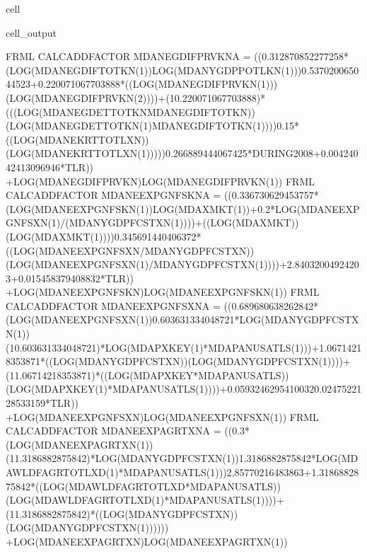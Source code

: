 \documentclass[letterpaper,10pt,english]{jupyterBook}
\begin{document}
\begin{sphinxuseclass}{cell}
\begin{sphinxVerbatimOutput}
\begin{sphinxuseclass}{cell_output}
\begin{sphinxVerbatim}[commandchars=\\\{\}]
FRML \PYGZlt{}CALC\PYGZus{}ADD\PYGZus{}FACTOR\PYGZgt{} MDANEGDIFPRVKN\PYGZus{}A = \PYGZhy{} ((\PYGZhy{}0.312870852277258*(LOG(MDANEGDIFTOTKN(\PYGZhy{}1))\PYGZhy{}LOG(MDANYGDPPOTLKN(\PYGZhy{}1)))\PYGZhy{}0.537020065044523+0.220071067703888*((LOG(MDANEGDIFPRVKN(\PYGZhy{}1)))\PYGZhy{}(LOG(MDANEGDIFPRVKN(\PYGZhy{}2))))+(1\PYGZhy{}0.220071067703888)*(((LOG(MDANEGDETTOTKN\PYGZhy{}MDANEGDIFTOTKN))\PYGZhy{}(LOG(MDANEGDETTOTKN(\PYGZhy{}1)\PYGZhy{}MDANEGDIFTOTKN(\PYGZhy{}1))))\PYGZhy{}0.15*((LOG(MDANEKRTTOTLXN))\PYGZhy{}(LOG(MDANEKRTTOTLXN(\PYGZhy{}1)))))\PYGZhy{}0.266889444067425*DURING\PYGZus{}2008+0.00424042413096946*T\PYGZus{}LR)) +LOG(MDANEGDIFPRVKN)\PYGZhy{}LOG(MDANEGDIFPRVKN(\PYGZhy{}1))\PYGZdl{}
FRML \PYGZlt{}CALC\PYGZus{}ADD\PYGZus{}FACTOR\PYGZgt{} MDANEEXPGNFSKN\PYGZus{}A = \PYGZhy{} ((\PYGZhy{}0.336730629453757*(LOG(MDANEEXPGNFSKN(\PYGZhy{}1))\PYGZhy{}LOG(MDAXMKT(\PYGZhy{}1))+0.2*LOG(MDANEEXPGNFSXN(\PYGZhy{}1)/(MDANYGDPFCSTXN(\PYGZhy{}1))))+((LOG(MDAXMKT))\PYGZhy{}(LOG(MDAXMKT(\PYGZhy{}1))))\PYGZhy{}0.345691440406372*((LOG(MDANEEXPGNFSXN/MDANYGDPFCSTXN))\PYGZhy{}(LOG(MDANEEXPGNFSXN(\PYGZhy{}1)/MDANYGDPFCSTXN(\PYGZhy{}1))))+2.84032004924203+0.015458379408832*T\PYGZus{}LR)) +LOG(MDANEEXPGNFSKN)\PYGZhy{}LOG(MDANEEXPGNFSKN(\PYGZhy{}1))\PYGZdl{}
FRML \PYGZlt{}CALC\PYGZus{}ADD\PYGZus{}FACTOR\PYGZgt{} MDANEEXPGNFSXN\PYGZus{}A = \PYGZhy{} ((\PYGZhy{}0.689680638262842*(LOG(MDANEEXPGNFSXN(\PYGZhy{}1))\PYGZhy{}0.603631334048721*LOG(MDANYGDPFCSTXN(\PYGZhy{}1))\PYGZhy{}(1\PYGZhy{}0.603631334048721)*LOG(MDAPXKEY(\PYGZhy{}1)*MDAPANUSATLS(\PYGZhy{}1)))+1.06714218353871*((LOG(MDANYGDPFCSTXN))\PYGZhy{}(LOG(MDANYGDPFCSTXN(\PYGZhy{}1))))+(1\PYGZhy{}1.06714218353871)*((LOG(MDAPXKEY*MDAPANUSATLS))\PYGZhy{}(LOG(MDAPXKEY(\PYGZhy{}1)*MDAPANUSATLS(\PYGZhy{}1))))+0.0593246295410032\PYGZhy{}0.0247522128533159*T\PYGZus{}LR)) +LOG(MDANEEXPGNFSXN)\PYGZhy{}LOG(MDANEEXPGNFSXN(\PYGZhy{}1))\PYGZdl{}
FRML \PYGZlt{}CALC\PYGZus{}ADD\PYGZus{}FACTOR\PYGZgt{} MDANEEXPAGRTXN\PYGZus{}A = \PYGZhy{} ((\PYGZhy{}0.3*(LOG(MDANEEXPAGRTXN(\PYGZhy{}1))\PYGZhy{}(1\PYGZhy{}1.3186882875842)*LOG(MDANYGDPFCSTXN(\PYGZhy{}1))\PYGZhy{}1.3186882875842*LOG(MDAWLDFAGRTOTLXD(\PYGZhy{}1)*MDAPANUSATLS(\PYGZhy{}1)))\PYGZhy{}2.85770216483863+1.3186882875842*((LOG(MDAWLDFAGRTOTLXD*MDAPANUSATLS))\PYGZhy{}(LOG(MDAWLDFAGRTOTLXD(\PYGZhy{}1)*MDAPANUSATLS(\PYGZhy{}1))))+(1\PYGZhy{}1.3186882875842)*((LOG(MDANYGDPFCSTXN))\PYGZhy{}(LOG(MDANYGDPFCSTXN(\PYGZhy{}1)))))) +LOG(MDANEEXPAGRTXN)\PYGZhy{}LOG(MDANEEXPAGRTXN(\PYGZhy{}1))\PYGZdl{}

\end{sphinxVerbatim}
\end{sphinxuseclass}
\end{sphinxVerbatimOutput}
\end{sphinxuseclass}
\end{document}
